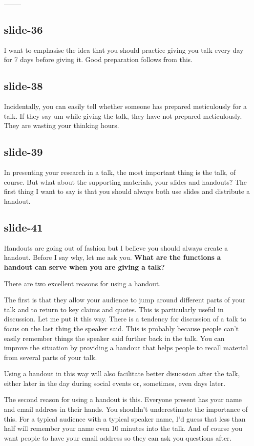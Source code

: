 \documentclass[12pt,\papersize]{extarticle}
\begin{document}
--------
\subsection{slide-36}
I want to emphasise the idea that you should practice giving you talk every day for 7 days before 
giving it.
Good preparation follows from this.
 
\subsection{slide-38}
Incidentally, you can easily tell whether someone has prepared meticulously for a talk.
If they say um while giving the talk, they have not prepared meticulously.
They are wasting your thinking hours.
 
\subsection{slide-39}
In presenting your research in a talk, the most important thing is the talk, of course.
But what about the supporting materials, your slides and handouts?
The first thing I want to say is that you should always both use slides and distribute a 
handout.
 
\subsection{slide-41}
Handouts are going out of fashion but I believe you should always create a handout.
Before I say why, let me ask you.
\textbf{What are the functions a handout can serve when you are giving a talk?}
 
There are two excellent reasons for using a handout.
 
The first is that they allow your audience to jump around different parts of your talk 
and to return to key claims and quotes.  
This is particularly useful in discussion.
Let me put it this way.
There is a tendency for discussion of a talk to focus on the last thing the speaker said.
This is probably because people can't easily remember things the speaker said further back in the 
talk.
You can improve the situation by providing a handout that helps people to recall material from
several parts of your talk.
 
Using a handout in this way will also facilitate better disucssion after the talk, either 
later in the day during social events or, sometimes, even days later.
 
The second reason for using a handout is this.
Everyone present has your name and email address in their hands.
You shouldn't underestimate the importance of this.  
For a typical audience with a typical speaker name, I'd guess that less than half will remember 
your name even 10 minutes into the talk.
And of course you want people to have your email address so they can ask you questions after.
 
\end{document}
